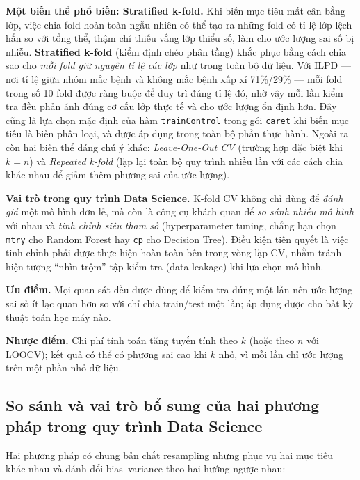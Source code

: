 \documentclass[14pt,a4paper]{extarticle}\usepackage[]{graphicx}\usepackage[]{xcolor}
\begin{document}
\textbf{Một biến thể phổ biến: Stratified k-fold.} Khi biến mục tiêu mất
cân bằng lớp, việc chia fold hoàn toàn ngẫu nhiên có thể tạo ra những fold
có tỉ lệ lớp lệch hẳn so với tổng thể, thậm chí thiếu vắng lớp thiểu số,
làm cho ước lượng sai số bị nhiễu. \textbf{Stratified k-fold} (kiểm định
chéo phân tầng) khắc phục bằng cách chia sao cho \emph{mỗi fold giữ nguyên
tỉ lệ các lớp} như trong toàn bộ dữ liệu. Với ILPD --- nơi tỉ lệ giữa
nhóm mắc bệnh và không mắc bệnh xấp xỉ 71\%/29\% --- mỗi fold trong số 10
fold được ràng buộc để duy trì đúng tỉ lệ đó, nhờ vậy mỗi lần kiểm tra đều
phản ánh đúng cơ cấu lớp thực tế và cho ước lượng ổn định hơn. Đây cũng là
lựa chọn mặc định của hàm \texttt{trainControl} trong gói \texttt{caret}
khi biến mục tiêu là biến phân loại, và được áp dụng trong toàn bộ phần
thực hành. Ngoài ra còn hai biến thể đáng chú ý khác: \emph{Leave-One-Out
CV} (trường hợp đặc biệt khi $k = n$) và \emph{Repeated k-fold} (lặp lại
toàn bộ quy trình nhiều lần với các cách chia khác nhau để giảm thêm
phương sai của ước lượng).

\textbf{Vai trò trong quy trình Data Science.} K-fold CV không chỉ dùng để
\emph{đánh giá} một mô hình đơn lẻ, mà còn là công cụ khách quan để
\emph{so sánh nhiều mô hình} với nhau và \emph{tinh chỉnh siêu tham số}
(hyperparameter tuning, chẳng hạn chọn \texttt{mtry} cho Random Forest hay
\texttt{cp} cho Decision Tree). Điều kiện tiên quyết là việc tinh chỉnh
phải được thực hiện hoàn toàn bên trong vòng lặp CV, nhằm tránh hiện tượng
``nhìn trộm'' tập kiểm tra (data leakage) khi lựa chọn mô hình.

\textbf{Ưu điểm.} Mọi quan sát đều được dùng để kiểm tra đúng một lần nên
ước lượng sai số ít lạc quan hơn so với chỉ chia train/test một lần; áp
dụng được cho bất kỳ thuật toán học máy nào.

\textbf{Nhược điểm.} Chi phí tính toán tăng tuyến tính theo $k$ (hoặc theo
$n$ với LOOCV); kết quả có thể có phương sai cao khi $k$ nhỏ, vì mỗi lần
chỉ ước lượng trên một phần nhỏ dữ liệu.

\subsection{So sánh và vai trò bổ sung của hai phương pháp trong quy trình Data Science}

Hai phương pháp có chung bản chất resampling nhưng phục vụ hai mục tiêu
khác nhau và đánh đổi bias--variance theo hai hướng ngược nhau:
\end{document}
